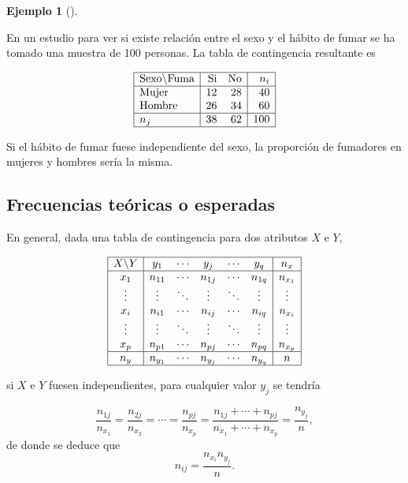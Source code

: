 \documentclass[
  a4paper,
]{scrreport}
\theoremstyle{plain}
\theoremstyle{definition}
\newtheorem{example}{Ejemplo}[chapter]
\theoremstyle{definition}
\theoremstyle{remark}
\begin{document}
\begin{example}[]\protect\hypertarget{exm-tabla-contingencia}{}\label{exm-tabla-contingencia}

En un estudio para ver si existe relación entre el sexo y el hábito de
fumar se ha tomado una muestra de 100 personas. La tabla de contingencia
resultante es

\[
\begin{array}{|l|rr|r|}
\hline
\mbox{Sexo}\backslash\mbox{Fuma} & \mbox{Si} & \mbox{No} & n_i\\
\hline
\mbox{Mujer} & 12 & 28 & 40 \\
\mbox{Hombre} & 26 & 34 & 60 \\
\hline
n_j & 38 & 62 & 100\\
\hline
\end{array}
\]

Si el hábito de fumar fuese independiente del sexo, la proporción de
fumadores en mujeres y hombres sería la misma.

\end{example}

\subsection{Frecuencias teóricas o
esperadas}\label{frecuencias-teuxf3ricas-o-esperadas}

En general, dada una tabla de contingencia para dos atributos \(X\) e
\(Y\),

\[
\begin{array}{|c|ccccc|c|}
\hline
X\backslash Y & y_1 & \cdots & y_j & \cdots & y_q & n_x\\
\hline
x_1 & n_{11} & \cdots & n_{1j} & \cdots & n_{1q} & n_{x_1}\\
\vdots & \vdots & \ddots & \vdots & \ddots & \vdots & \vdots \\
x_i & n_{i1} & \cdots & n_{ij} & \cdots & n_{iq} & n_{x_i}\\
\vdots & \vdots & \ddots & \vdots & \ddots & \vdots & \vdots\\
x_p & n_{p1} & \cdots & n_{pj} & \cdots & n_{pq} & n_{x_p} \\
\hline
n_y & n_{y_1} & \cdots & n_{y_j} & \cdots & n_{y_q} & n\\
\hline
\end{array}
\]

si \(X\) e \(Y\) fuesen independientes, para cualquier valor \(y_j\) se
tendría

\[
\frac{n_{1j}}{n_{x_1}} = \frac{n_{2j}}{n_{x_2}} = \cdots = \frac{n_{pj}}{n_{x_p}} = \frac{n_{1j}+\cdots
+n_{pj}}{n_{x_1}+\cdots+n_{x_p}} = \frac{n_{y_j}}{n},\] de donde se
deduce que \[n_{ij} = \frac{n_{x_i}n_{y_j}}{n}.
\]
\end{document}
